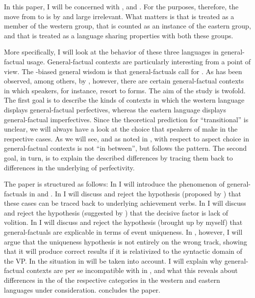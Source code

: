 \documentclass[output=paper,modfonts,newtxmath,hidelinks]{langscibook}
\begin{document}
In this paper, I will be concerned with ,  and . 
For the  purposes, therefore, the move from \citet{Dickey2000} to \citet{Dickey15} is by and large irrelevant. 
What matters is that  is treated as a member of 
the western group, that  is counted as an instance of the eastern group, 
and that  is treated as a language sharing properties with both these groups.

More specifically, I will look at the  behavior of these three languages in general-factual usage.
General-factual contexts are particularly interesting from a  point of view.
The -biased general wisdom is that general-factuals call for . As has been observed, among others, by \citet{Dickey2000}, however, 
there are certain general-factual contexts in which  speakers, for instance, resort to  forms.  
The aim of the  study is twofold. The first goal is to describe the kinds of contexts in which the western language  displays general-factual perfectives, whereas 
the eastern language  displays general-factual imperfectives. Since the theoretical prediction for ``transitional''  is unclear, 
we will always have a look at the choice that speakers of  
make in the respective cases. As we will see, and as noted in 
\citet[101]{Dickey2000}, with respect to aspect choice in general-factual contexts  is not ``in between'', but 
follows the  pattern.  
The second goal, in turn, is to explain the described differences by tracing them back to differences in the underlying 
 of perfectivity. 

The paper is structured as follows: 
In  I will introduce the phenomenon of  general-factuals in  and . 
In  I will discuss and reject the hypothesis (proposed by \citealt{Dickey2000}) that these cases can be traced back to underlying achievement verbs. 
In  I will discuss and reject the hypothesis (suggested by \citealt{Cummins1987}) that the decisive factor is lack of volition. 
In  I will discuss and reject the hypothesis (brought up by myself) that  general-factuals are explicable in terms of event uniqueness.
In , however, I will argue that the uniqueness hypothesis is not entirely on the wrong track, showing that 
it will produce correct results if it is relativized to the syntactic domain of the VP.
In  the situation in  will be taken into account. I will explain why general-factual contexts are per se incompatible
with  in , and what this reveals about differences in the  of the respective  categories
in the western and eastern  languages under consideration. 
 concludes the paper. 
\end{document}

